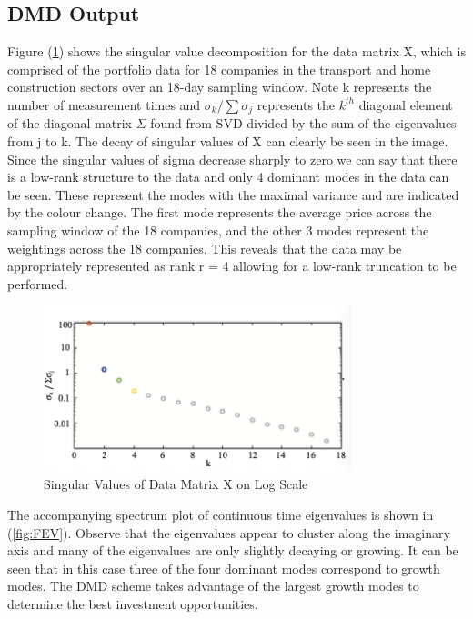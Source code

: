 \documentclass[12pt]{report}
\begin{document}
\subsection{DMD Output}
Figure (\ref{fig:FSVD}) shows the singular value decomposition for the data matrix X, which is comprised of the portfolio data for 18 companies in the transport and home construction sectors over an 18-day sampling window. Note k represents the number of measurement times and $\sigma_{k}/\sum\sigma_{j}$ represents the $k^{th}$ diagonal element of the diagonal matrix $\Sigma$ found from SVD divided by the sum of the eigenvalues from j to k. The decay of singular values of X can clearly be seen in the image. Since the singular values of sigma decrease sharply to zero we can say that there is a low-rank structure to the data and only 4 dominant modes in the data can be seen. These represent the modes with the maximal variance and are indicated by the colour change. The first mode represents the average price across the sampling window of the 18 companies, and the other 3 modes represent the weightings across the 18 companies. This reveals that the data may be appropriately represented as rank r = 4 allowing for a low-rank truncation to be performed.  

\begin{figure}[H]
    \centering
    \includegraphics[width=0.8\textwidth]{Application pics/MA680 (F) SVD.png}
    \caption{Singular Values of Data Matrix X on Log Scale} \label{fig:FSVD}
\end{figure}
\noindent

The accompanying spectrum plot of continuous time eigenvalues is shown in (\ref{fig:FEV}). Observe that the eigenvalues appear to cluster along the imaginary axis and many of the eigenvalues are only slightly decaying or growing.  It can be seen that in this case three of the four dominant modes correspond to growth modes. The DMD scheme takes advantage of the largest growth modes to determine the best investment opportunities.   
\end{document}
